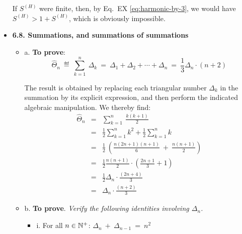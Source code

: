 \begin{itemize}
\smallskip

If $S^{(H)}$ were finite, then, by Eq.~EX \ref{eq:harmonic-by-3}, we would have $S^{(H)}  > 1 + S^{(H)} $, which is obviously impossible. 


\medskip
\item
{\bf 6.8. Summations, and summations of summations}
\smallskip

  \begin{itemize}
  \item a.
{\bf To prove}: 
\[ \widehat{\Theta}_n \ \eqdef \  \sum_{k=1}^n \ \Delta_k \ = \   
\Delta_1 + \Delta_2 + \cdots + \Delta_n \ = \ \frac{1}{3} \Delta_n \cdot (n+2) \]

The result is obtained by replacing each triangular number $\Delta_k$ in the summation by its explicit expression, and then perform the indicated algebraic manipulation.  We thereby find:
\begin{eqnarray*}
\widehat{\Theta}_n & = & \sum_{k=1}^n \ \frac{k(k+1)}{2} \\
    & = & \frac{1}{2} \sum_{k=1}^n k^2  + \frac{1}{2} \sum_{k=1}^n k  \\
    & = & \frac{1}{2} \ \left( \frac{n (2n+1) (n+1)}{6} \ + \ \frac{n (n+1)}{2} \right)\\
    & = & \frac{1}{2} \frac{n (n+1)}{2} \cdot \left( \frac{2n+1}{3} + 1 \right)  \\
    & = & \frac{1}{2} \Delta_n \cdot \frac{(2n+4)}{3}  \\
    & = & \Delta_n \cdot \frac{(n+2)}{3}
\end{eqnarray*} 


  \item b.
{\bf To prove}.  {\em Verify the following identities involving $\Delta_n$.}

\smallskip

    \begin{itemize}
    \item i.
For all $n \in \mathbb{N}^+$:
$\Delta_n \ + \ \Delta_{n-1} \ = \ n^2$

\smallskip


\end{itemize}
\end{itemize}
\end{itemize}
